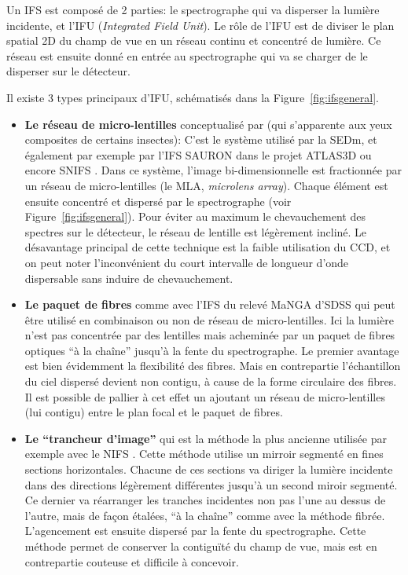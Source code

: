 \documentclass[../main/main.tex]{subfiles}
\begin{document}
Un IFS est composé de 2 parties: le spectrographe qui va disperser la
lumière incidente, et l'IFU (\textit{Integrated Field Unit}). Le rôle de l'IFU
est de diviser le plan spatial 2D du champ de vue en un réseau continu
et concentré de lumière. Ce réseau est ensuite donné en entrée au
spectrographe qui va se charger de le disperser sur le détecteur.

Il existe 3 types principaux d'IFU, schématisés dans la Figure~\ref{fig:ifsgeneral}.
\begin{itemize}[label=$\bullet$]
\itemsep0em 
\item \textbf{Le réseau de micro-lentilles} conceptualisé par
  \citet{BaconIFUlens} (qui s'apparente aux yeux composites
  de certains insectes): C'est le système utilisé par la SEDm, et
  également par exemple par l'IFS SAURON \citep{SAURONifs} dans le projet ATLAS3D
  \citep{ATLAS3D} ou encore SNIFS \citep{SNIFS2004}. Dans ce système,
  l'image bi-dimensionnelle est fractionnée par un réseau de
  micro-lentilles (le MLA, \textit{microlens array}). Chaque élément est ensuite
  concentré et dispersé par le spectrographe (voir
  Figure~\ref{fig:ifsgeneral}). Pour éviter au maximum le chevauchement des
  spectres sur le détecteur, le réseau de lentille est légèrement
  incliné. Le désavantage principal de cette technique est la
  faible utilisation du CCD, et on peut noter l'inconvénient du court
  intervalle de longueur d'onde dispersable sans induire de chevauchement.
  
\item \textbf{Le paquet de fibres} comme
  avec l'IFS du relevé MaNGA d'SDSS \citep{SDSSIFS} qui peut
  être utilisé en combinaison \citep{BardenIFUfiber} ou non
  \citep{allingtonIFUlensfiber} de réseau de micro-lentilles.
  Ici la lumière n'est pas concentrée par des lentilles mais acheminée
  par un paquet de fibres optiques ``à la chaîne'' jusqu'à la fente du spectrographe. Le
  premier avantage est bien évidemment la flexibilité des fibres. Mais
  en contrepartie l'échantillon du ciel dispersé devient non contigu, à
  cause de la forme circulaire des fibres. Il est possible de pallier à
  cet effet un ajoutant un réseau de micro-lentilles (lui contigu) entre
  le plan focal et le paquet de fibres.  
  
\item \textbf{Le ``trancheur d'image''} qui est la méthode la plus
  ancienne \citep{BowenIFUslicer,ContentIFUslicer} utilisée
  par exemple avec le NIFS
   \citep[\textit{near-infrared integral field spectrograph},][]{GeminiNIFS}. Cette
  méthode utilise un mirroir segmenté en fines sections
  horizontales. Chacune de ces sections va diriger la lumière incidente
  dans des directions légèrement différentes jusqu'à un second miroir
  segmenté. Ce dernier va réarranger les tranches incidentes non pas
  l'une au dessus de l'autre, mais de façon étalées, ``à la chaîne''
  comme avec la méthode fibrée. L'agencement est ensuite dispersé par la
  fente du spectrographe. Cette méthode permet de conserver la
  contiguïté du champ de vue, mais est en contrepartie couteuse et
  difficile à concevoir.
\end{itemize}
\end{document}
